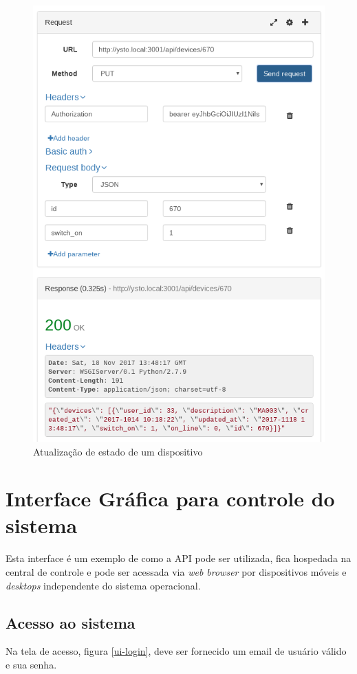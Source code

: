 \begin{figure}[H]
\caption{\label{api-update-device} Atualização de estado de um dispositivo}
\includegraphics[scale=0.35]{img/09-update-device.png}
\end{figure}


\section{Interface Gráfica para controle do sistema}
Esta interface é um exemplo de como a API pode ser utilizada, fica hospedada na central de controle e pode ser acessada via \textit{web browser} por dispositivos móveis e \textit{desktops} independente do sistema operacional.

\subsection{Acesso ao sistema}
Na tela de acesso, figura \ref{ui-login}, deve ser fornecido um email de usuário válido e sua senha.

